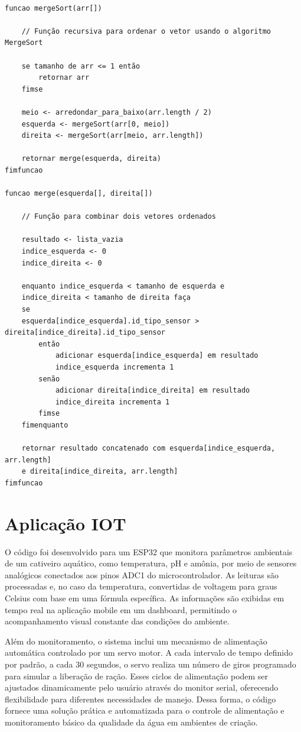 \documentclass[
  a4paper,
  12pt,
  english,
  brazilian,
]{article}
\begin{document}
\begin{verbatim}

funcao mergeSort(arr[])

    // Função recursiva para ordenar o vetor usando o algoritmo MergeSort

    se tamanho de arr <= 1 então
        retornar arr
    fimse

    meio <- arredondar_para_baixo(arr.length / 2)
    esquerda <- mergeSort(arr[0, meio])
    direita <- mergeSort(arr[meio, arr.length])

    retornar merge(esquerda, direita)
fimfuncao

funcao merge(esquerda[], direita[])

    // Função para combinar dois vetores ordenados

    resultado <- lista_vazia
    indice_esquerda <- 0
    indice_direita <- 0

    enquanto indice_esquerda < tamanho de esquerda e 
    indice_direita < tamanho de direita faça
    se 
    esquerda[indice_esquerda].id_tipo_sensor > direita[indice_direita].id_tipo_sensor 
        então
            adicionar esquerda[indice_esquerda] em resultado
            indice_esquerda incrementa 1
        senão
            adicionar direita[indice_direita] em resultado
            indice_direita incrementa 1
        fimse
    fimenquanto

    retornar resultado concatenado com esquerda[indice_esquerda, arr.length] 
    e direita[indice_direita, arr.length]
fimfuncao

\end{verbatim}

\section*{\textbf{Aplicação IOT}}

O código foi desenvolvido para um ESP32 que monitora parâmetros ambientais de um cativeiro aquático, como temperatura, pH e amônia, por meio de sensores analógicos conectados aos pinos ADC1 do microcontrolador. As leituras são processadas e, no caso da
temperatura, convertidas de voltagem para graus Celsius com base em uma fórmula específica. As informações são exibidas em tempo real na aplicação mobile em um dashboard, permitindo o acompanhamento visual constante das condições do ambiente.

Além do monitoramento, o sistema inclui um mecanismo de alimentação automática controlado por um servo motor. A cada intervalo de tempo definido por padrão, a cada 30 segundos, o servo realiza um número de giros programado para simular a liberação de ração.
Esses ciclos de alimentação podem ser ajustados dinamicamente pelo usuário através do monitor serial, oferecendo flexibilidade para diferentes necessidades de manejo. Dessa forma, o código fornece uma solução prática e automatizada para o controle de alimentação e monitoramento básico da qualidade da água em ambientes de criação.
\end{document}
